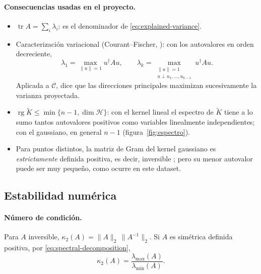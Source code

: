 \documentclass[11pt,a4paper]{article}
\newcommand{\Hk}{\mathcal{H}}
\newcommand{\dg}{\dagger}                         %
\newcommand{\Kc}{\widetilde{K}}                   %
\newcommand{\norm}[1]{\lVert #1\rVert}
\DeclareMathOperator{\tr}{tr}
\DeclareMathOperator{\rg}{rg}
\theoremstyle{plain}
\theoremstyle{definition}
\theoremstyle{remark}
\numberwithin{equation}{section}
\begin{document}
\paragraph{Consecuencias usadas en el proyecto.}
\begin{itemize}
  \item $\tr A=\sum_i\lambda_i$: es el denominador de \eqref{eq:explained-variance}.
  \item Caracterización variacional (Courant--Fischer, \cite[teorema 4.2.6]{hornjohnson2013}):
        con los autovalores en orden decreciente,
        \begin{equation}\label{eq:courant-fischer}
          \lambda_1=\max_{\norm u=1}u^{\dg}Au,\qquad
          \lambda_k=\max_{\substack{\norm u=1\\ u\perp u_1,\dots,u_{k-1}}}u^{\dg}Au .
        \end{equation}
        Aplicada a $\mathcal C$, dice que las direcciones principales maximizan
        sucesivamente la varianza proyectada.
  \item $\rg\Kc\le\min\{n-1,\dim\Hk\}$: con el kernel lineal el espectro de $\Kc$ tiene a lo
        sumo tantos autovalores positivos como variables linealmente independientes; con el
        gaussiano, en general $n-1$ (figura~\ref{fig:espectro}).
  \item Para puntos distintos, la matriz de Gram del kernel gaussiano es \emph{estrictamente}
        definida positiva, es decir, inversible \cite{micchelli1986}; pero su menor autovalor
        puede ser muy pequeño, como ocurre en este dataset.
\end{itemize}

\subsection{Estabilidad numérica}\label{sec:estabilidad}

\paragraph{Número de condición.} Para $A$ inversible,
$\kappa_2(A)=\norm{A}_2\,\norm{A^{-1}}_2$. Si $A$ es simétrica definida positiva, por
\eqref{eq:spectral-decomposition},
\begin{equation}\label{eq:condition-number}
  \kappa_2(A)=\frac{\lambda_{\max}(A)}{\lambda_{\min}(A)} .
\end{equation}
\end{document}
